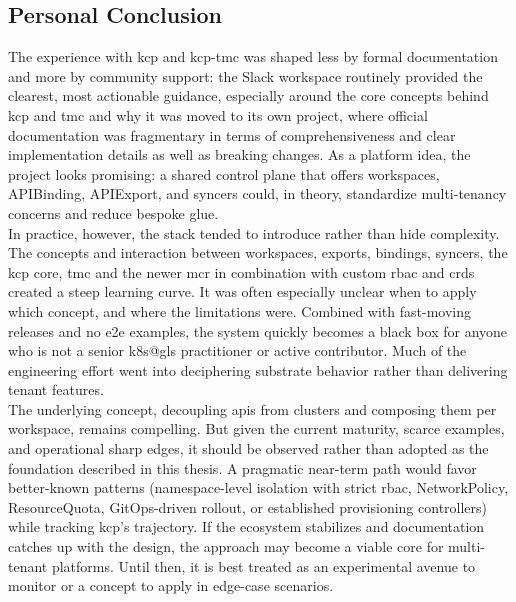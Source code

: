 \documentclass[11pt, a4paper, oneside, listof=totoc]{scrartcl}
\begin{document}
        \subsection{Personal Conclusion}\label{subsec:personalConclusion}
            The experience with \gls{kcp} and \gls{kcp}-\gls{tmc} was shaped less by formal
            documentation and more by community support: the Slack workspace routinely provided the
            clearest, most actionable guidance, especially around the core concepts behind \gls{kcp}
            and \gls{tmc} and why it was moved to its own project, where official documentation
            was fragmentary in terms of comprehensiveness and clear implementation details as well
            as breaking changes.
            As a platform idea, the project looks promising: a shared control plane that offers
            workspaces, APIBinding, APIExport, and syncers could, in theory, standardize
            multi-tenancy concerns and reduce bespoke glue.\\
            In practice, however, the stack tended to introduce rather than hide complexity.
            The concepts and interaction between workspaces, exports, bindings, syncers, the
            \gls{kcp} core, \gls{tmc} and the newer \gls{mcr} in combination with custom \gls{rbac}
            and \glspl{crd} created a steep learning curve.
            It was often especially unclear when to apply which concept, and where the limitations
            were.
            Combined with fast-moving releases and no \gls{e2e} examples, the system quickly
            becomes a black box for anyone who is not a senior \gls{k8s@gls} practitioner or active
            contributor.
            Much of the engineering effort went into deciphering substrate behavior rather than
            delivering tenant features.\\
            The underlying concept, decoupling \glspl{api} from clusters and composing them per
            workspace, remains compelling.
            But given the current maturity, scarce examples, and operational sharp edges, it should
            be observed rather than adopted as the foundation described in this thesis.
            A pragmatic near-term path would favor better-known patterns (namespace-level isolation
            with strict \gls{rbac}, NetworkPolicy, ResourceQuota, GitOps-driven rollout, or
            established provisioning controllers) while tracking \gls{kcp}'s trajectory.
            If the ecosystem stabilizes and documentation catches up with the design, the approach
            may become a viable core for multi-tenant platforms.
            Until then, it is best treated as an experimental avenue to monitor or a concept to
            apply in edge-case scenarios.
\end{document}
